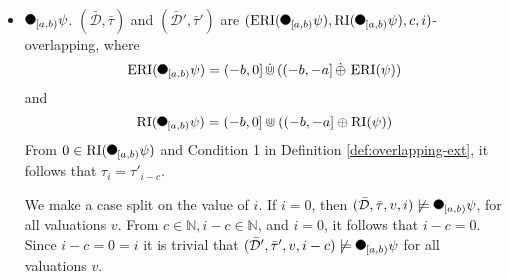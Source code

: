 \begin{itemize}
    \item
        $\Previous{[a,b)} \psi$.
        $(\bar{\mathcal{D}}, \bar{\tau})$ and $(\bar{\mathcal{D}}', \bar{\tau}')$ are $(\ERI(\Previous{[a,b)} \psi), \RI(\Previous{[a,b)} \psi), c, i)$- overlapping, where
        \begin{equation*}
            \ERI(\Previous{[a,b)} \psi) = (-b,0] \Cupext ((-b,-a] \oplusext \ERI(\psi))
        \end{equation*}
        and
        \begin{equation*}
            \RI(\Previous{[a,b)} \psi) = (-b,0] \Cup ((-b,-a] \oplus \RI(\psi))
        \end{equation*}
        From $0 \in \RI(\Previous{[a,b)} \psi)$ and Condition 1 in Definition \ref{def:overlapping-ext}, it follows that $\tau_i = \tau'_{i-c}$.

        We make a case split on the value of $i$. If $i=0$, then $(\bar{\mathcal{D}}, \bar{\tau}, v, i) \not\models \Previous{[a,b)} \psi$, for all valuations $v$.
        From $c \in \mathbb{N}, i-c \in \mathbb{N}$, and $i=0$, it follows that $i-c=0$.
        Since $i-c = 0 = i$ it is trivial that $(\bar{\mathcal{D}}', \bar{\tau}', v, i-c) \not\models \Previous{[a,b)} \psi$ for all valuations $v$.


\end{itemize}

